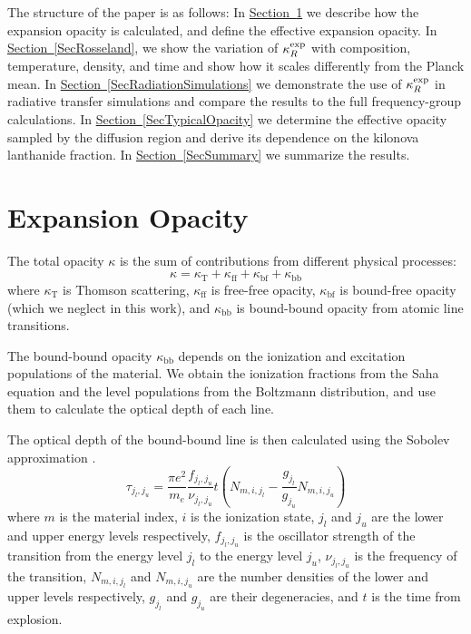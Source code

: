 \documentclass[final,5p,times,twocolumn]{elsarticle}
\DeclareRobustCommand{\secref}[1]{\hyperref[#1]{Section~\ref*{#1}}}
\begin{document}
    The structure of the paper is as follows: In \secref{SecExpansion} we describe how the expansion opacity is calculated, 
    and define the effective expansion opacity.
    In \secref{SecRosseland}, we show the variation of $\kappa_R^{\rm exp}$ with composition, temperature, density, and time
    and show how it scales differently from the Planck mean.
    In \secref{SecRadiationSimulations} we demonstrate the use of $\kappa_R^{\rm exp}$ in radiative transfer simulations and compare the
    results to the full frequency-group calculations.
    In \secref{SecTypicalOpacity} we determine the effective opacity sampled by the diffusion
    region and derive its dependence on the kilonova lanthanide fraction.
    In \secref{SecSummary} we summarize the results.


\section{Expansion Opacity}
    \label{SecExpansion}
    
    The total opacity $\kappa$ is the sum of contributions from different physical processes:
    \begin{equation}
    \kappa = \kappa_{\mathrm{T}} + \kappa_{\mathrm{ff}} + \kappa_{\mathrm{bf}} + \kappa_{\mathrm{bb}}
    \end{equation}
    where $\kappa_{\mathrm{T}}$ is Thomson scattering, $\kappa_{\mathrm{ff}}$ is free-free opacity, $\kappa_{\mathrm{bf}}$ is 
    bound-free opacity (which we neglect in this work), and $\kappa_{\mathrm{bb}}$ is bound-bound opacity from atomic line 
    transitions.

    The bound-bound opacity $\kappa_{\mathrm{bb}}$ depends on the ionization and excitation populations
    of the material. We obtain the ionization fractions from the Saha equation and the level
    populations from the Boltzmann distribution, and use them to calculate the optical depth of each line.

    The optical depth of the bound-bound line is then calculated using the Sobolev approximation \cite{eastmanpinto1993}.
    \begin{equation}
        \tau_{j_l,j_u} = \frac{\pi e^{2}}{m_{e}} \frac{f_{j_l,j_u}}{\nu_{j_l,j_u}} t \left(N_{m,i,j_l} - \frac{g_{j_l}}{g_{j_u}} N_{m,i,j_u}\right)
    \end{equation}
    where $m$ is the material index, $i$ is the ionization state, $j_l$ and $j_u$ are the lower and upper energy levels respectively,
    $f_{j_l,j_u}$ is the oscillator strength of the transition 
    from the energy level $j_l$ to the energy level $j_u$, $\nu_{j_l,j_u}$ is the frequency of the transition, $N_{m,i,j_l}$ and $N_{m,i,j_u}$ 
    are the number densities of the lower and upper levels respectively, $g_{j_l}$ and $g_{j_u}$ are their degeneracies, and $t$ is the time from explosion.
\end{document}
